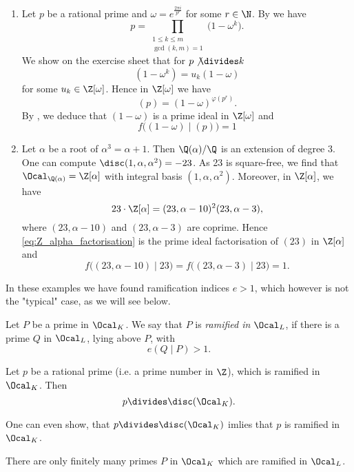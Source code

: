 \begin{exmp*}
	\begin{enumerate}[label=(\alph*)]
		\item Let \( p \) be a rational prime and \( \omega = e^{\frac{2\pi i}{p^r}} \) for some \( r \in \N \).
			By  we have
			\[ p = \prod_{\substack{1 \leq k \leq m\\\gcd(k,m)=1}} \big( 1-\omega^k \big). \]
			We show on the exercise sheet that for \( p \not\divides k \)
			\[ (1-\omega^k) = u_k (1-\omega) \]
			for some \( u_k \in \Z[\omega] \).
			Hence in \( \Z[\omega] \) we have
			\[ (p) = (1-\omega)^{\varphi(p^r)}. \]
			By , we deduce that \( (1-\omega) \) is a prime ideal in \( \Z[\omega] \) and
			\[ f\big( (1-\omega) \mid (p) \big) = 1 \]
			
		\item Let \( \alpha \) be a root of \( \alpha^3 = \alpha + 1 \).
			Then \( \Q(\alpha) / \Q \) is an extension of degree 3.
			One can compute \( \disc(1, \alpha, \alpha^2) = -23 \).
			As 23 is square-free, we find that \( \Ocal_{\Q(\alpha)} = \Z[\alpha] \) with integral basis \( (1, \alpha, \alpha^2) \).
			Moreover, in \( \Z[\alpha] \), we have
			\begin{equation}\label{eq:Z_alpha_factorisation}
				23 \cdot \Z[\alpha] = (23, \alpha-10)^2 (23, \alpha-3),
			\end{equation}
			where \( (23, \alpha-10) \) and \( (23, \alpha-3) \) are coprime.
			Hence \eqref{eq:Z_alpha_factorisation} is the prime ideal factorisation of \( (23) \) in \( \Z[\alpha] \) and
			\[ f\big( (23, \alpha-10) \mid 23 \big) = f\big( (23, \alpha-3) \mid 23 \big) = 1. \]
	\end{enumerate}
\end{exmp*}

\begin{rem*}
	In these examples we have found ramification indices \( e>1 \), which however is not the "typical" case, as we will see below.
\end{rem*}

\begin{defn*}
	Let \( P \) be a prime in \( \Ocal_K \).
	We say that \( P \) is \emph{ramified in} \( \Ocal_L \), if there is a prime \( Q \) in \( \Ocal_L \), lying above \( P \), with
	\[ e(Q \mid P) > 1. \]
\end{defn*}

\begin{thmn}\label{thm:2.18}
	Let \( p \) be a rational prime (i.e. a prime number in \( \Z \)), which is ramified in \( \Ocal_K \).
	Then
	\[ p \divides \disc(\Ocal_K). \]
\end{thmn}

\begin{rem*}
	One can even show, that \( p \divides \disc(\Ocal_K) \) imlies that \( p \) is ramified in \( \Ocal_K \).
\end{rem*}

\begin{cor}
	There are only finitely many primes \( P \) in \( \Ocal_K \) which are ramified in \( \Ocal_L \).
\end{cor}